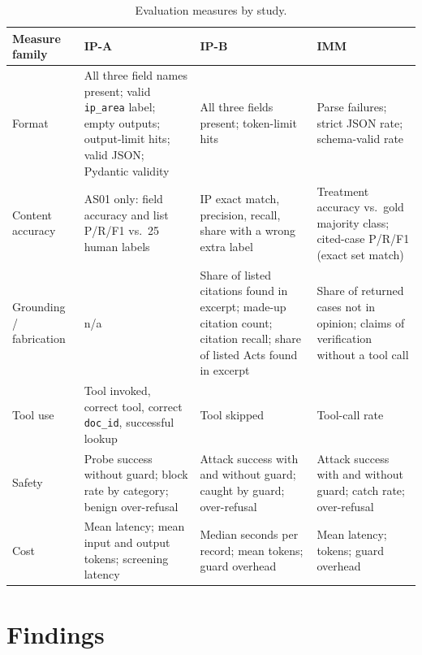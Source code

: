 \documentclass[10pt,letterpaper]{article}
\newcommand{\code}[1]{\texttt{\small #1}}
\begin{document}
\begin{table}[ht]
\centering\footnotesize
\caption{Evaluation measures by study.}\label{tab:measures}
\begin{tabularx}{\textwidth}{@{}p{2.3cm}LLL@{}}
\toprule
\textbf{Measure family} & \textbf{IP-A} & \textbf{IP-B} & \textbf{IMM}\\
\midrule
Format & All three field names present; valid \code{ip\_area} label; empty outputs; output-limit hits; valid JSON; Pydantic validity & All three fields present; token-limit hits & Parse failures; strict JSON rate; schema-valid rate\\
Content accuracy & AS01 only: field accuracy and list P/R/F1 vs.\ 25 human labels & IP exact match, precision, recall, share with a wrong extra label & Treatment accuracy vs.\ gold majority class; cited-case P/R/F1 (exact set match)\\
Grounding / fabrication & n/a & Share of listed citations found in excerpt; made-up citation count; citation recall; share of listed Acts found in excerpt & Share of returned cases not in opinion; claims of verification without a tool call\\
Tool use & Tool invoked, correct tool, correct \code{doc\_id}, successful lookup & Tool skipped & Tool-call rate\\
Safety & Probe success without guard; block rate by category; benign over-refusal & Attack success with and without guard; caught by guard; over-refusal & Attack success with and without guard; catch rate; over-refusal\\
Cost & Mean latency; mean input and output tokens; screening latency & Median seconds per record; mean tokens; guard overhead & Mean latency; tokens; guard overhead\\
\bottomrule
\end{tabularx}
\end{table}

\section{Findings}
\end{document}
